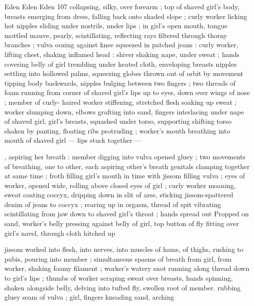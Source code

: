 Eden Eden Eden 107
collapsing, silky, over forearm ; top of shaved girl's body, breasts
emerging from dress, falling back onto shaded slope ; curly worker
licking hot nipples sliding under nostrils, under lips ; in girl's open
mouth, tongue mottled mauve, pearly, scintillating, reflecting rays
filtered through thorny branches ; vulva oozing against knee
squeezed in patched jeans : curly worker, lifting chest, shaking
inflamed head : shiver shaking nape, under sweat ; hands covering
belly of girl trembling under heated cloth, enveloping breasts
nipples settling into hollowed palms, squeezing globes thrown out of
orbit by movement tipping body backwards, nipples bulging between
two fingers ; two threads of foam running from corner of shaved
girl's lips up to eyes, down over wings of nose ; member of curly-
haired worker stiffening, stretched flesh soaking up sweat ; worker
slumping down, elbows grafting into sand, fingers interlacing under
nape of shaved girl, girl's breasts, squashed under torso, supporting
shifting torso shaken by panting, floating ribs protruding ; worker's
mouth breathing into mouth of shaved girl — lips stuck together —

, aspiring her breath : member digging into vulva opened gluey ; two
movements of breathing, one to other, each aspiring other's breath
genitals clamping together at same time ; froth filling girl's mouth in
time with jissom filling vulva ; eyes of worker, opened wide, rolling
above closed eyes of girl ; curly worker moaning, sweat coating
coccyx, dripping down in slit of arse, sticking jissom-spattered denim
of jeans to coccyx ; rearing up in orgasm, thread of spit vibrating
scintillating from jaw down to shaved girl's throat ; hands spread out
Propped on sand, worker's belly pressing against belly of girl, top
button of fly fitting over girl's navel, through cloth hitched up

jissom worked into flesh, into nerves, into muscles of hams, of
thighs, rushing to pubis, pouring into member ; simultaneous spasms
of breath from girl, from worker, shaking foamy filament ; worker's
watery snot running along thread down to girl's lips ; thumbs of
worker scraping sweat over breasts, hands spinning, shaken
alongside belly, delving into tufted fly, swollen root of member.
rubbing gluey seam of vulva ; girl, fingers kneading sand, arching

